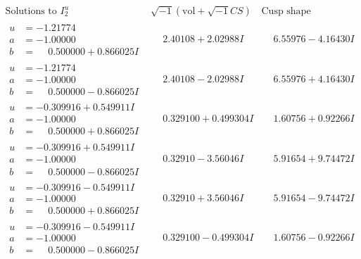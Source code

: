 \documentclass[1p]{elsarticle_modified}
\theoremstyle{definition}
\newcommand{\I}{\sqrt{-1}}
\begin{document}
$$\begin{array}{c|c|c}  
\text{Solutions to }I^u_{2}& \I (\text{vol} + \sqrt{-1}CS) & \text{Cusp shape}\\
 \hline 
\begin{aligned}
u &= -1.21774\phantom{ +0.000000I} \\
a &= -1.00000\phantom{ +0.000000I} \\
b &= \phantom{-}0.500000 + 0.866025 I\end{aligned}
 & \phantom{-}2.40108 + 2.02988 I & \phantom{-}6.55976 - 4.16430 I \\ \hline\begin{aligned}
u &= -1.21774\phantom{ +0.000000I} \\
a &= -1.00000\phantom{ +0.000000I} \\
b &= \phantom{-}0.500000 - 0.866025 I\end{aligned}
 & \phantom{-}2.40108 - 2.02988 I & \phantom{-}6.55976 + 4.16430 I \\ \hline\begin{aligned}
u &= -0.309916 + 0.549911 I \\
a &= -1.00000\phantom{ +0.000000I} \\
b &= \phantom{-}0.500000 + 0.866025 I\end{aligned}
 & \phantom{-}0.329100 + 0.499304 I & \phantom{-}1.60756 + 0.92266 I \\ \hline\begin{aligned}
u &= -0.309916 + 0.549911 I \\
a &= -1.00000\phantom{ +0.000000I} \\
b &= \phantom{-}0.500000 - 0.866025 I\end{aligned}
 & \phantom{-}0.32910 - 3.56046 I & \phantom{-}5.91654 + 9.74472 I \\ \hline\begin{aligned}
u &= -0.309916 - 0.549911 I \\
a &= -1.00000\phantom{ +0.000000I} \\
b &= \phantom{-}0.500000 + 0.866025 I\end{aligned}
 & \phantom{-}0.32910 + 3.56046 I & \phantom{-}5.91654 - 9.74472 I \\ \hline\begin{aligned}
u &= -0.309916 - 0.549911 I \\
a &= -1.00000\phantom{ +0.000000I} \\
b &= \phantom{-}0.500000 - 0.866025 I\end{aligned}
 & \phantom{-}0.329100 - 0.499304 I & \phantom{-}1.60756 - 0.92266 I \\ \hline\begin{aligned}

\end{aligned}
\end{array}$$
\end{document}
